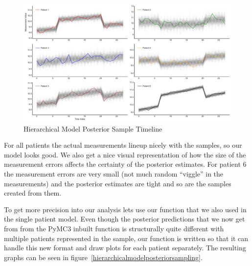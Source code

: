 \documentclass[12pt,a4paper,leqno]{report}
\theoremstyle{plain}
\theoremstyle{definition}
\theoremstyle{remark}
\begin{document}
\bigskip
\begin{figure}[H]
    \caption{Hierarchical Model Posterior Sample Timeline}\label{hierarhicalmodelposteriortimeline}
    \bigskip
    \includegraphics[width=\textwidth,height=\textheight,keepaspectratio]{posterior_sample_timeline_hierarchical_model.pdf}
\end{figure}
\bigskip

For all patients the actual measurements lineup nicely with the samples, so our model
looks good. We also get a nice visual representation of how the size of the measurement errors
affects the certainty of the posterior estimates. For patient 6 the measurement errors are
very small (not much random ``viggle'' in the measurements) and the posterior estimates
are tight and so are the samples created from them.

To get more precision into our analysis lets use our 
function that we also used in the single patient model. Even though the posterior
predictions that we now get from from the PyMC3 inbuilt
 function is structurally quite different with
multiple patients represented in the sample, our function is written
so that it can handle this new format and draw plots for each patient separately. The
resulting graphs can be seen in figure\ \ref{hierarchicalmodelposteriorsampling}.
\end{document}
